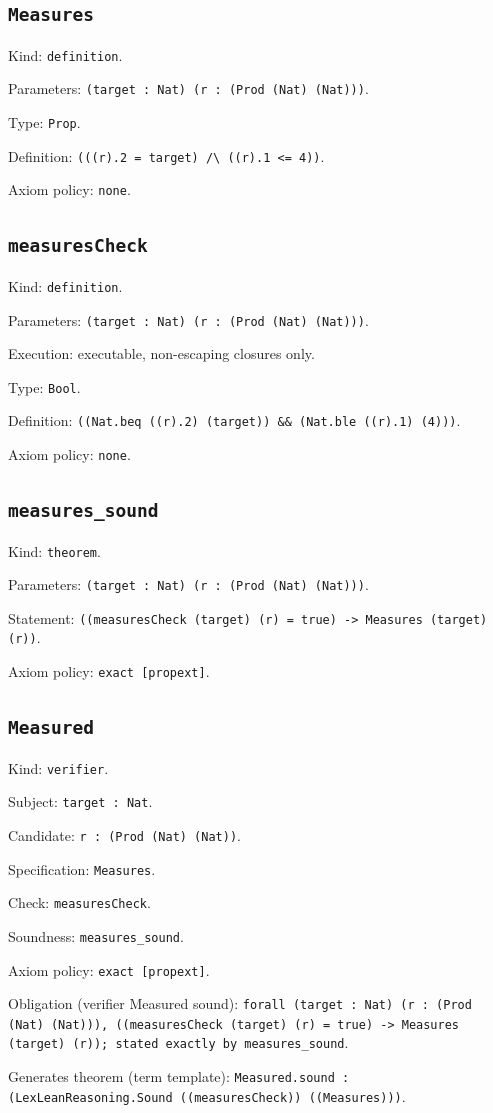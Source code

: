 \documentclass[11pt]{article}
\begin{document}
\subsection*{\texttt{Measures}}
\noindent Kind: \texttt{definition}.\par
\noindent Parameters: \texttt{(target : Nat) (r : (Prod (Nat) (Nat)))}.\par
\noindent Type: \texttt{Prop}.\par
\noindent Definition: \texttt{(((r).2 = target) /\textbackslash{} ((r).1 <= 4))}.\par
\noindent Axiom policy: \texttt{none}.\par
\subsection*{\texttt{measuresCheck}}
\noindent Kind: \texttt{definition}.\par
\noindent Parameters: \texttt{(target : Nat) (r : (Prod (Nat) (Nat)))}.\par
\noindent Execution: executable, non-escaping closures only.\par
\noindent Type: \texttt{Bool}.\par
\noindent Definition: \texttt{((Nat.beq ((r).2) (target)) \&\& (Nat.ble ((r).1) (4)))}.\par
\noindent Axiom policy: \texttt{none}.\par
\subsection*{\texttt{measures\_sound}}
\noindent Kind: \texttt{theorem}.\par
\noindent Parameters: \texttt{(target : Nat) (r : (Prod (Nat) (Nat)))}.\par
\noindent Statement: \texttt{((measuresCheck (target) (r) = true) -> Measures (target) (r))}.\par
\noindent Axiom policy: \texttt{exact [propext]}.\par
\subsection*{\texttt{Measured}}
\noindent Kind: \texttt{verifier}.\par
\noindent Subject: \texttt{target : Nat}.\par
\noindent Candidate: \texttt{r : (Prod (Nat) (Nat))}.\par
\noindent Specification: \texttt{Measures}.\par
\noindent Check: \texttt{measuresCheck}.\par
\noindent Soundness: \texttt{measures\_sound}.\par
\noindent Axiom policy: \texttt{exact [propext]}.\par
\noindent Obligation (verifier Measured sound): \texttt{forall (target : Nat) (r : (Prod (Nat) (Nat))), ((measuresCheck (target) (r) = true) -> Measures (target) (r)); stated exactly by measures\_sound}.\par
\noindent Generates theorem (term template): \texttt{Measured.sound : (LexLeanReasoning.Sound ((measuresCheck)) ((Measures)))}.\par
\end{document}
